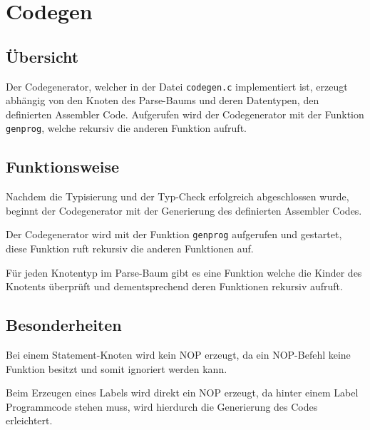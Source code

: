 \chapter{Codegen}
\label{chap:codegen}

\section{Übersicht}
\label{sec:codegen_overview}
Der Codegenerator, welcher in der Datei \texttt{codegen.c} implementiert ist,
erzeugt abhängig von den Knoten des Parse-Baums und deren Datentypen, den definierten Assembler Code. 
Aufgerufen wird der Codegenerator mit der Funktion \texttt{genprog}, welche rekursiv die
anderen Funktion aufruft.

\section{Funktionsweise}
\label{sec:codegen_func}

Nachdem die Typisierung und der Typ-Check erfolgreich abgeschlossen wurde, beginnt der Codegenerator mit der Generierung des definierten Assembler Codes.

Der Codegenerator wird mit der Funktion \texttt{genprog} aufgerufen und gestartet, diese Funktion
ruft rekursiv die anderen Funktionen auf.

Für jeden Knotentyp im Parse-Baum gibt es eine Funktion welche die Kinder des Knotents überprüft und dementsprechend deren Funktionen rekursiv aufruft.

\section{Besonderheiten}
\label{sec:codegen_special}

Bei einem Statement-Knoten wird kein NOP erzeugt, da ein NOP-Befehl keine Funktion besitzt und somit ignoriert werden kann.

Beim Erzeugen eines Labels wird direkt ein NOP erzeugt, da hinter einem Label Programmcode stehen muss, wird hierdurch die Generierung des Codes erleichtert.